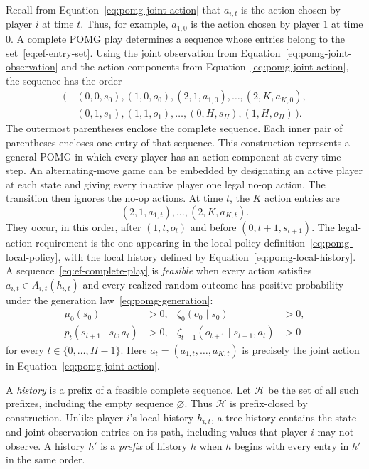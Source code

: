 Recall from Equation~\eqref{eq:pomg-joint-action} that $a_{i,t}$ is the action chosen by player $i$ at time $t$. Thus, for example, $a_{1,0}$ is the action chosen by player $1$ at time $0$. A complete POMG play determines a sequence whose entries belong to the set~\eqref{eq:ef-entry-set}. Using the joint observation from Equation~\eqref{eq:pomg-joint-observation} and the action components from Equation~\eqref{eq:pomg-joint-action}, the sequence has the order
\begin{equation}
\label{eq:ef-complete-play}
\begin{aligned}
    \bigl(&\,(0,0,s_0),(1,0,o_0),
      (2,1,a_{1,0}),\ldots,(2,K,a_{K,0}),\\
    &\,(0,1,s_1),(1,1,o_1),
      \ldots,
      (0,H,s_H),(1,H,o_H)\,\bigr).
\end{aligned}
\end{equation}
The outermost parentheses enclose the complete sequence. Each inner pair of parentheses encloses one entry of that sequence. This construction represents a general POMG in which every player has an action component at every time step. An alternating-move game can be embedded by designating an active player at each state and giving every inactive player one legal no-op action. The transition then ignores the no-op actions.
At time $t$, the $K$ action entries are
\[
    (2,1,a_{1,t}),\ldots,(2,K,a_{K,t}).
\]
They occur, in this order, after $(1,t,o_t)$ and before $(0,t+1,s_{t+1})$.
The legal-action requirement is the one appearing in the local policy definition~\eqref{eq:pomg-local-policy}, with the local history defined by Equation~\eqref{eq:pomg-local-history}. A sequence~\eqref{eq:ef-complete-play} is \emph{feasible} when every action satisfies $a_{i,t}\in A_{i,t}(h_{i,t})$ and every realized random outcome has positive probability under the generation law~\eqref{eq:pomg-generation}:
\begin{equation}
\label{eq:ef-feasibility}
\begin{aligned}
    \mu_0(s_0)&>0,
    &\zeta_0(o_0\mid s_0)&>0,\\
    p_t(s_{t+1}\mid s_t,a_t)&>0,
    &\zeta_{t+1}(o_{t+1}\mid s_{t+1},a_t)&>0
\end{aligned}
\end{equation}
for every $t\in\{0,\ldots,H-1\}$. Here $a_t=(a_{1,t},\ldots,a_{K,t})$ is precisely the joint action in Equation~\eqref{eq:pomg-joint-action}.

A \emph{history} is a prefix of a feasible complete sequence. Let $\mathcal{H}$ be the set of all such prefixes, including the empty sequence $\varnothing$. Thus $\mathcal{H}$ is prefix-closed by construction. Unlike player $i$'s local history $h_{i,t}$, a tree history contains the state and joint-observation entries on its path, including values that player $i$ may not observe. A history $h'$ is a \emph{prefix} of history $h$ when $h$ begins with every entry in $h'$ in the same order.

